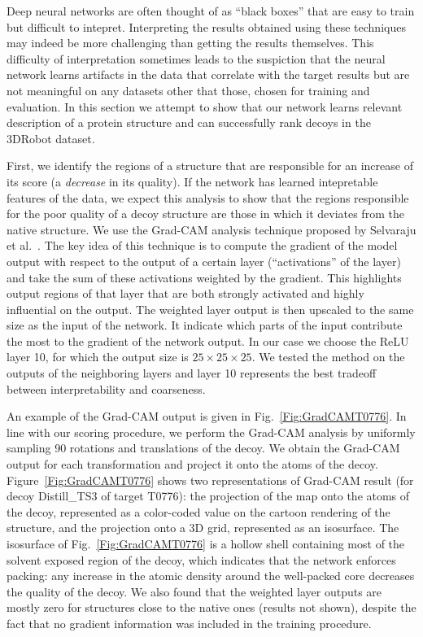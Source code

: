 Deep neural networks are often thought of as ``black boxes'' that are
easy to train but difficult to intepret. Interpreting the results
obtained using these techniques may indeed be more challenging than
getting the results themselves. This difficulty of interpretation
sometimes leads to the suspiction that the neural network learns
artifacts in the data that correlate with the target results but are
not meaningful on any datasets other that those, chosen for training and evaluation.
%
In this section we attempt to show that our network learns relevant
description of a protein structure and can successfully rank decoys in the 3DRobot dataset.

First, we identify the regions of a structure that are responsible for
an increase of its score (a \emph{decrease} in its quality). If the
network has learned intepretable features of the data, we expect this
analysis to show that the regions responsible for the poor quality of
a decoy structure are those in which it deviates from the native
structure.
%
We use the Grad-CAM analysis technique proposed by Selvaraju et
al.~\cite{selvaraju2016grad}. The key idea of this technique is to
compute the gradient of the model output with respect to the output of a certain layer (``activations'' of the layer) 
and take the sum of these activations weighted by the gradient.
This highlights output regions of that layer that are both strongly
activated and highly influential on the output.
The weighted layer output is then upscaled to the same size as the input of the network. 
It indicate which parts of the input contribute the most to the gradient of the network output.
In our case we choose the ReLU layer 10, for which
the output size is $25\times 25\times 25$.
We tested the method on the outputs of the neighboring layers and
layer 10 represents the best tradeoff between interpretability and
coarseness.

An example of the Grad-CAM output is given in Fig.~\ref{Fig:GradCAMT0776}.
In line with our scoring procedure, we perform the Grad-CAM analysis
by uniformly sampling 90 rotations and translations of the decoy. We
obtain the Grad-CAM output for each transformation and
project it onto the atoms of the decoy. 
Figure~\ref{Fig:GradCAMT0776} shows two representations of Grad-CAM result 
(for decoy Distill\_TS3 of target T0776): the
projection of the map onto the atoms of the decoy, represented as a
color-coded value on the cartoon rendering of the structure, and the
projection onto a 3D grid, represented as an isosurface. The
isosurface of Fig.~\ref{Fig:GradCAMT0776} is a hollow shell containing
most of the solvent exposed region of the decoy, which indicates that
the network enforces packing: any increase in the atomic density
around the well-packed core decreases the quality of the decoy.
%
We also found that the weighted layer outputs are mostly zero for
structures close to the native ones (results not shown), despite the
fact that no gradient information was included in the training
procedure.

